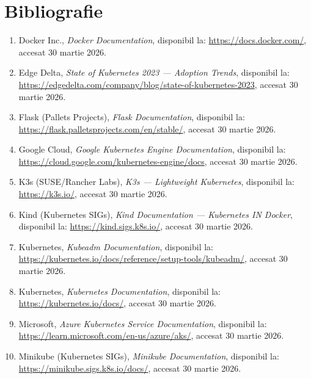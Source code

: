 \documentclass[12pt,a4paper]{report}
\begin{document}
\chapter*{Bibliografie}

\begin{enumerate}

\item Docker Inc., \textit{Docker Documentation}, disponibil la: \url{https://docs.docker.com/}, accesat 30 martie 2026.

\item Edge Delta, \textit{State of Kubernetes 2023 — Adoption Trends}, disponibil la: \url{https://edgedelta.com/company/blog/state-of-kubernetes-2023}, accesat 30 martie 2026.

\item Flask (Pallets Projects), \textit{Flask Documentation}, disponibil la: \url{https://flask.palletsprojects.com/en/stable/}, accesat 30 martie 2026.

\item Google Cloud, \textit{Google Kubernetes Engine Documentation}, disponibil la: \url{https://cloud.google.com/kubernetes-engine/docs}, accesat 30 martie 2026.

\item K3s (SUSE/Rancher Labs), \textit{K3s — Lightweight Kubernetes}, disponibil la: \url{https://k3s.io/}, accesat 30 martie 2026.

\item Kind (Kubernetes SIGs), \textit{Kind Documentation — Kubernetes IN Docker}, disponibil la: \url{https://kind.sigs.k8s.io/}, accesat 30 martie 2026.

\item Kubernetes, \textit{Kubeadm Documentation}, disponibil la: \url{https://kubernetes.io/docs/reference/setup-tools/kubeadm/}, accesat 30 martie 2026.

\item Kubernetes, \textit{Kubernetes Documentation}, disponibil la: \url{https://kubernetes.io/docs/}, accesat 30 martie 2026.

\item Microsoft, \textit{Azure Kubernetes Service Documentation}, disponibil la: \url{https://learn.microsoft.com/en-us/azure/aks/}, accesat 30 martie 2026.

\item Minikube (Kubernetes SIGs), \textit{Minikube Documentation}, disponibil la: \url{https://minikube.sigs.k8s.io/docs/}, accesat 30 martie 2026.


\end{enumerate}
\end{document}
